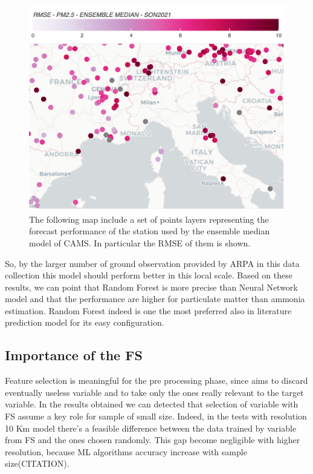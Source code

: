 \begin{figure}[H]
    \centering
    \includegraphics[scale=0.2]{src/images/cams_obs.png}
    \caption{The following map include a set of points layers representing the forecast performance of the station used by the ensemble median model of CAMS. In particular the RMSE of them is shown\cite{camsobs}. 
}
    \label{fig:cams}
\end{figure}

So, by the larger number of ground observation provided by ARPA in this data collection this model should perform better in this local scale.
\bigbreak
Based on these results, we can point that Random Forest is more precise than Neural Network model and that the performance are higher for particulate matter than ammonia estimation.
Random Forest indeed is one the most preferred also in literature prediction model for its easy configuration.
\subsection{Importance of the FS}
Feature selection is meaningful for the pre processing phase, since aims to discard eventually useless variable and to take only the ones really relevant to the target variable. In the results obtained we can detected that selection of variable with FS assume a key role for sample of small size. 
Indeed, in the tests with resolution 10 Km model there's a feasible difference between the data trained by variable from FS and the ones chosen randomly. 
This gap become negligible with higher resolution, because ML algorithms accuracy increase with sample size(CITATION).

